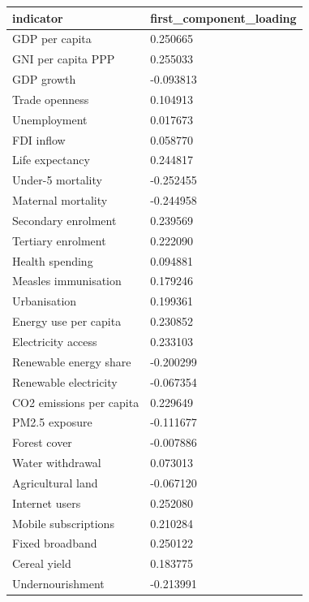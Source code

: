 \begin{tabular}{ll}
\hline
indicator & first\_component\_loading \\
\hline
GDP per capita & 0.250665 \\
GNI per capita PPP & 0.255033 \\
GDP growth & -0.093813 \\
Trade openness & 0.104913 \\
Unemployment & 0.017673 \\
FDI inflow & 0.058770 \\
Life expectancy & 0.244817 \\
Under-5 mortality & -0.252455 \\
Maternal mortality & -0.244958 \\
Secondary enrolment & 0.239569 \\
Tertiary enrolment & 0.222090 \\
Health spending & 0.094881 \\
Measles immunisation & 0.179246 \\
Urbanisation & 0.199361 \\
Energy use per capita & 0.230852 \\
Electricity access & 0.233103 \\
Renewable energy share & -0.200299 \\
Renewable electricity & -0.067354 \\
CO2 emissions per capita & 0.229649 \\
PM2.5 exposure & -0.111677 \\
Forest cover & -0.007886 \\
Water withdrawal & 0.073013 \\
Agricultural land & -0.067120 \\
Internet users & 0.252080 \\
Mobile subscriptions & 0.210284 \\
Fixed broadband & 0.250122 \\
Cereal yield & 0.183775 \\
Undernourishment & -0.213991 \\
\hline
\end{tabular}
